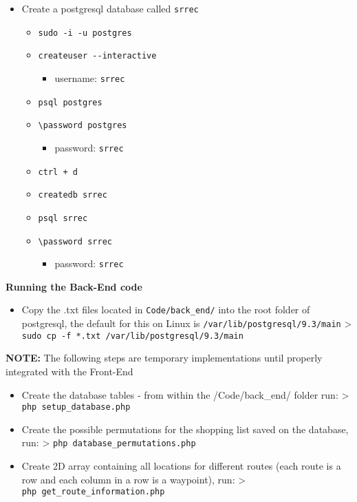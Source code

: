 \documentclass[10pt, a4paper, onecolumn]{scrartcl}
\begin{document}
	\begin{itemize}[noitemsep]
		\item
		Create a postgresql database called \texttt{srrec}
		
		\begin{itemize}[noitemsep]
			\item
			\texttt{sudo\ -i\ -u\ postgres}
			\item
			\texttt{createuser\ -\/-interactive}
			
			\begin{itemize}[noitemsep]
				\item
				username: \texttt{srrec}
			\end{itemize}
			\item
			\texttt{psql\ postgres}
			\item
			\texttt{\textbackslash{}password\ postgres}
			
			\begin{itemize}[noitemsep]
				\item
				password: \texttt{srrec}
			\end{itemize}
			\item
			\texttt{ctrl\ +\ d}
			\item
			\texttt{createdb\ srrec}
			\item
			\texttt{psql\ srrec}
			\item
			\texttt{\textbackslash{}password\ srrec}
			
			\begin{itemize}[noitemsep]
				\item
				password: \texttt{srrec}
			\end{itemize}
		\end{itemize}
	\end{itemize}
	
	\textbf{Running the Back-End code} 
	
		\begin{itemize}[noitemsep]
			\item 	Copy the .txt files located in \texttt{Code/back\_end/} into the root
			folder of postgresql, the default for this on Linux is
			\texttt{/var/lib/postgresql/9.3/main} \textgreater{}
			\texttt{sudo\ cp\ -f\ *.txt\ /var/lib/postgresql/9.3/main}
		\end{itemize}
	
	\textbf{NOTE:} The following steps are temporary implementations until
	properly integrated with the Front-End 
	
		\begin{itemize}[noitemsep]
			\item 	Create the database tables - from within the /Code/back\_end/ folder
			run: \textgreater{} \texttt{php\ setup\_database.php}
			\item 	Create the possible permutations for the shopping list saved on the
			database, run: \textgreater{} \texttt{php\ database\_permutations.php}
			\item 	Create 2D array containing all locations for different routes (each
			route is a row and each column in a row is a waypoint), run:
			\textgreater{} \texttt{php\ get\_route\_information.php} 
		\end{itemize}
	
\end{document}
